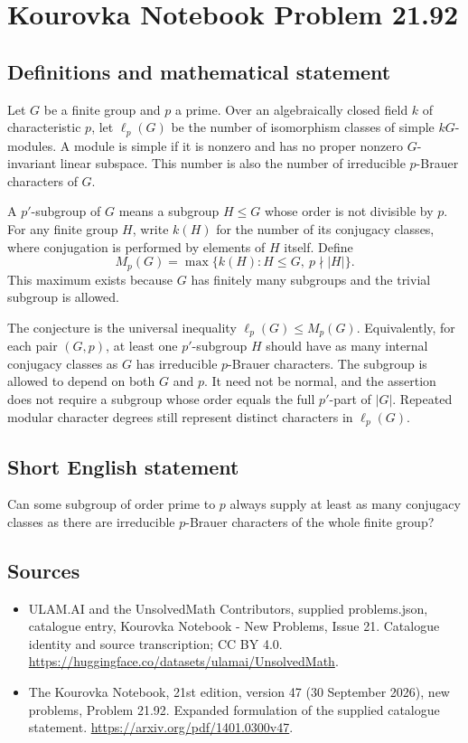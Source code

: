 \documentclass[11pt,a4paper]{article}
\begin{document}
\section*{Kourovka Notebook Problem 21.92}\label{statement}

\subsection{Definitions and mathematical statement}
Let $G$ be a finite group and $p$ a prime. Over an algebraically closed field $k$ of characteristic $p$, let $\ell_p(G)$ be the number of isomorphism classes of simple $kG$-modules. A module is simple if it is nonzero and has no proper nonzero $G$-invariant linear subspace. This number is also the number of irreducible $p$-Brauer characters of $G$.

A $p'$-subgroup of $G$ means a subgroup $H\le G$ whose order is not divisible by $p$. For any finite group $H$, write $k(H)$ for the number of its conjugacy classes, where conjugation is performed by elements of $H$ itself. Define
\[
 M_p(G)=\max\{k(H):H\le G,\ p\nmid|H|\}.
\]
This maximum exists because $G$ has finitely many subgroups and the trivial subgroup is allowed.

The conjecture is the universal inequality $\ell_p(G)\le M_p(G)$. Equivalently, for each pair $(G,p)$, at least one $p'$-subgroup $H$ should have as many internal conjugacy classes as $G$ has irreducible $p$-Brauer characters. The subgroup is allowed to depend on both $G$ and $p$. It need not be normal, and the assertion does not require a subgroup whose order equals the full $p'$-part of $|G|$. Repeated modular character degrees still represent distinct characters in $\ell_p(G)$.
\subsection{Short English statement}
Can some subgroup of order prime to $p$ always supply at least as many conjugacy classes as there are irreducible $p$-Brauer characters of the whole finite group?
\subsection{Sources}
\begin{itemize}
\item[S1] ULAM.AI and the UnsolvedMath Contributors, supplied problems.json, catalogue entry, Kourovka Notebook - New Problems, Issue 21. Catalogue identity and source transcription; CC BY 4.0.
\url{https://huggingface.co/datasets/ulamai/UnsolvedMath}.
\item[S2] The Kourovka Notebook, 21st edition, version 47 (30 September 2026), new problems, Problem 21.92. Expanded formulation of the supplied catalogue statement.
\url{https://arxiv.org/pdf/1401.0300v47}.
\end{itemize}
\end{document}
